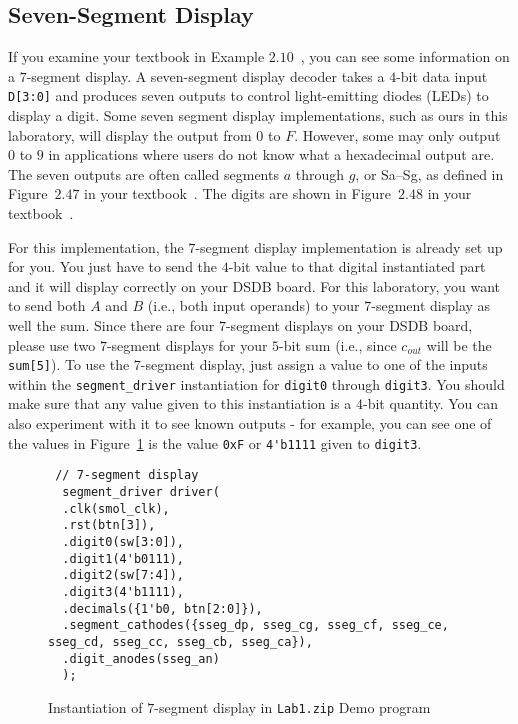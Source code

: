\documentclass{article}
\begin{document}
\subsection{Seven-Segment Display}

If you examine your textbook in Example $2.10$~\cite{ddca-riscv},
you can see some
information on a $7$-segment display.
A seven-segment display decoder takes a $4$-bit data input
\verb!D[3:0]! and produces seven outputs to control light-emitting
diodes (LEDs) to display a digit.
Some seven segment display implementations, such as ours in this
laboratory, will display the output from $0$ to $F$.  However, some
may only output $0$ to $9$ in applications where users do not know
what a hexadecimal output are.
The seven outputs are often
called segments $a$ through $g$, or Sa–Sg, as defined in Figure~$2.47$ in
your textbook~\cite{ddca-riscv}. The
digits are shown in Figure~$2.48$ in your textbook~\cite{ddca-riscv}.

For this implementation, the $7$-segment display implementation is
already set up for you.  You just have to send the $4$-bit value to
that digital instantiated part and it will display correctly on your
DSDB board.  For this laboratory, you want to send both $A$ and $B$
(i.e., both input operands) to your $7$-segment display as well the
sum.  Since there are four $7$-segment displays on your DSDB board,
please use two $7$-segment
displays for your $5$-bit sum (i.e., since $c_{out}$
will be the \verb!sum[5]!).  To use the $7$-segment display, just
assign a value to one of the inputs within the \verb!segment_driver!
instantiation for
\verb!digit0! through \verb!digit3!.  You should make sure that any value
given to this instantiation is a $4$-bit quantity.  You can also experiment
with it to see known outputs - for example, you can see one of the
values in
Figure~\ref{demo.fig} is the value \verb!0xF! or \verb!4'b1111!
given to \verb!digit3!.
\begin{figure}
{\small
\begin{verbatim}
 // 7-segment display
  segment_driver driver(
  .clk(smol_clk),
  .rst(btn[3]),
  .digit0(sw[3:0]),
  .digit1(4'b0111),
  .digit2(sw[7:4]),
  .digit3(4'b1111),
  .decimals({1'b0, btn[2:0]}),
  .segment_cathodes({sseg_dp, sseg_cg, sseg_cf, sseg_ce, sseg_cd, sseg_cc, sseg_cb, sseg_ca}),
  .digit_anodes(sseg_an)
  );
\end{verbatim}
}
\cprotect\caption{Instantiation of $7$-segment display in
  \verb!Lab1.zip! Demo program}
\label{demo.fig}
\end{figure}
\end{document}

